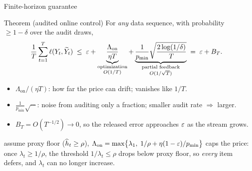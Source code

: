 \begin{frame}{Finite-horizon guarantee}
  \begin{block}{Theorem (audited online control)}
    For \emph{any} data sequence, with probability $\ge 1-\delta$ over the audit draws,
    \[
      \frac1T\sum_{t=1}^{T}\ell(Y_t,\widetilde Y_t)\;\le\;
      \varepsilon
      +\underbrace{\frac{\Lambda_{\mathrm{on}}}{\eta T}}_{\substack{\text{optimization}\\ O(1/T)}}
      +\underbrace{\frac{1}{p_{\min}}\sqrt{\frac{2\log(1/\delta)}{T}}}_{\substack{\text{partial feedback}\\ O(1/\sqrt T)}}
      \;=\;\varepsilon+B_T.
    \]
  \end{block}
  \begin{itemize}
    \item $\Lambda_{\mathrm{on}}/(\eta T)$: how far the price can drift; vanishes like $1/T$.
    \item $\tfrac{1}{p_{\min}}\sqrt{\cdots}$: noise from auditing only a fraction;
          smaller audit rate $\Rightarrow$ larger.
    \item $B_T=O(T^{-1/2})\to0$, so the released error
          approaches $\varepsilon$ as the stream grows.
  \end{itemize}
  \footnotesize\textcolor{accent}{assume proxy floor
  ($\widehat h_t\ge\rho$), $\Lambda_{\mathrm{on}}=\max\bigl\{\lambda_1,\;
  1/\rho+\eta(1-\varepsilon)/p_{\min}\bigr\}$ caps the price: once
  $\lambda_t\ge1/\rho$, the threshold $1/\lambda_t \le \rho $ drops below proxy floor, 
  so \emph{every} item defers, and $\lambda_t$ can no longer increase.}
\end{frame}
